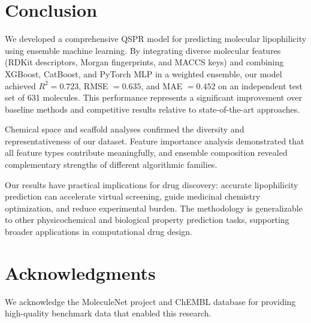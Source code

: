 \documentclass[12pt,a4paper]{article}
\begin{document}
\section{Conclusion}

We developed a comprehensive QSPR model for predicting molecular lipophilicity using ensemble machine learning. By integrating diverse molecular features (RDKit descriptors, Morgan fingerprints, and MACCS keys) and combining XGBoost, CatBoost, and PyTorch MLP in a weighted ensemble, our model achieved $R^2 = 0.723$, RMSE $= 0.635$, and MAE $= 0.452$ on an independent test set of 631 molecules. This performance represents a significant improvement over baseline methods and competitive results relative to state-of-the-art approaches.

Chemical space and scaffold analyses confirmed the diversity and representativeness of our dataset. Feature importance analysis demonstrated that all feature types contribute meaningfully, and ensemble composition revealed complementary strengths of different algorithmic families.

Our results have practical implications for drug discovery: accurate lipophilicity prediction can accelerate virtual screening, guide medicinal chemistry optimization, and reduce experimental burden. The methodology is generalizable to other physicochemical and biological property prediction tasks, supporting broader applications in computational drug design.

\section*{Acknowledgments}

We acknowledge the MoleculeNet project and ChEMBL database for providing high-quality benchmark data that enabled this research.



\end{document}
